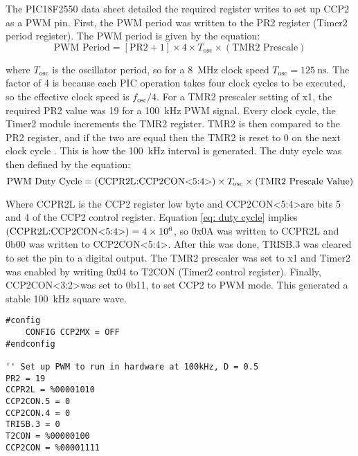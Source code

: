 The PIC18F2550 data sheet \cite{pic18f2550} detailed the required register writes to set up CCP2 as a PWM pin. First, the PWM period was written to the PR2 register (Timer2 period register). The PWM period is given by the equation:
\begin{equation}
\text{PWM Period} = [\text{PR2}+1] \times 4 \times T_\text{osc} \times (\text{TMR2 Prescale})
\end{equation}

where $T_\text{osc}$ is the oscillator period, so for a \SI{8}{\mega\hertz} clock speed $T_\text{osc}=\SI{125}{\nano\second}$. The factor of 4 is because each PIC operation takes four clock cycles to be executed, so the effective clock speed is $f_\text{osc}/4$. For a TMR2 prescaler setting of x1, the required PR2 value was 19 for a \SI{100}{\kilo\hertz} PWM signal. Every clock cycle, the Timer2 module increments the TMR2 register. TMR2 is then compared to the PR2 register, and if the two are equal then the TMR2 is reset to 0 on the next clock cycle \cite{pic18f2550}. This is how the \SI{100}{\kilo\hertz} interval is generated. The duty cycle was then defined by the equation:
\begin{equation}
\text{PWM Duty Cycle} = (\text{CCPR2L:CCP2CON\textless5:4\textgreater}) \times T_\text{osc} \times (\text{TMR2 Prescale Value}) \label{eq: duty cycle}
\end{equation}

Where CCPR2L is the CCP2 register low byte and CCP2CON\textless5:4\textgreater are bits 5 and 4 of the CCP2 control register. Equation \ref{eq: duty cycle} implies $(\text{CCPR2L:CCP2CON\textless5:4\textgreater}) = \num{4e6}$, so 0x0A was written to CCPR2L and 0b00 was written to CCP2CON\textless5:4\textgreater. After this was done, TRISB.3 was cleared to set the pin to a digital output. The TMR2 prescaler was set to x1 and Timer2 was enabled by writing 0x04 to T2CON (Timer2 control register). Finally, CCP2CON\textless3:2\textgreater was set to 0b11, to set CCP2 to PWM mode. This generated a stable \SI{100}{\kilo\hertz} square wave.\\
\begin{lstlisting}
#config
    CONFIG CCP2MX = OFF
#endconfig

'' Set up PWM to run in hardware at 100kHz, D = 0.5
PR2 = 19
CCPR2L = %00001010
CCP2CON.5 = 0
CCP2CON.4 = 0
TRISB.3 = 0
T2CON = %00000100
CCP2CON = %00001111
\end{lstlisting}




